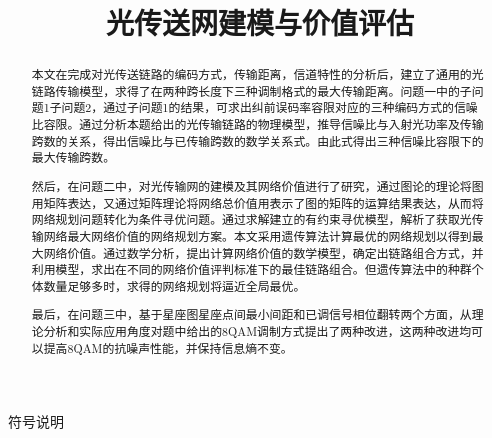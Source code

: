 \documentclass[bwprint]{gmcmthesis}
\title{光传送网建模与价值评估}
\numberwithin{equation}{section}
\begin{document}
 
 \maketitle
 
\begin{abstract}
本文在完成对光传送链路的编码方式，传输距离，信道特性的分析后，建立了通用的光链路传输模型，求得了在两种跨长度下三种调制格式的最大传输距离。问题一中的子问题1子问题2，通过子问题1的结果，可求出纠前误码率容限对应的三种编码方式的信噪比容限。通过分析本题给出的光传输链路的物理模型，推导信噪比与入射光功率及传输跨数的关系，得出信噪比与已传输跨数的数学关系式。由此式得出三种信噪比容限下的最大传输跨数。

然后，在问题二中，对光传输网的建模及其网络价值进行了研究，通过图论的理论将图用矩阵表达，又通过矩阵理论将网络总价值用表示了图的矩阵的运算结果表达，从而将网络规划问题转化为条件寻优问题。通过求解建立的有约束寻优模型，解析了获取光传输网络最大网络价值的网络规划方案。本文采用遗传算法计算最优的网络规划以得到最大网络价值。通过数学分析，提出计算网络价值的数学模型，确定出链路组合方式，并利用模型，求出在不同的网络价值评判标准下的最佳链路组合。但遗传算法中的种群个体数量足够多时，求得的网络规划将逼近全局最优。

最后，在问题三中，基于星座图星座点间最小间距和已调信号相位翻转两个方面，从理论分析和实际应用角度对题中给出的8QAM调制方式提出了两种改进，这两种改进均可以提高8QAM的抗噪声性能，并保持信息熵不变。






\end{abstract}

\pagestyle{plain}

\tableofcontents

\newpage
\large\centerline{\heiti 符号说明}
\end{document}
